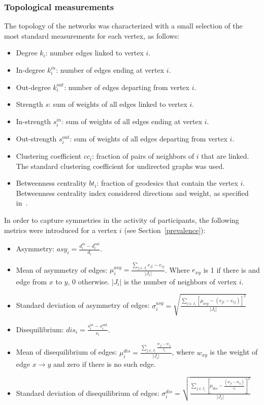 \documentclass[%
 aip,
 jmp,%
 amsmath,amssymb,
 reprint,%
]{revtex4-1}
\begin{document}
\subsubsection{Topological measurements}\label{measures}

The topology of the networks was characterized with a small selection of the most standard measurements for each vertex, as follows:

\begin{itemize}
    \item Degree $k_i$: number edges linked to vertex $i$.
    \item In-degree $k_i^{in}$: number of edges ending at vertex $i$.
    \item Out-degree $k_i^{out}$: number of edges departing from vertex $i$.
    \item Strength $s$: sum of weights of all edges linked to vertex $i$.
    \item In-strength $s_i^{in}$: sum of weights of all edges ending at vertex $i$.
    \item Out-strength $s_i^{out}$: sum of weights of all edges departing from vertex $i$.
    \item Clustering coefficient $cc_i$: fraction of pairs of neighbors of $i$ that are linked.  The standard clustering coefficient for undirected graphs was used.
  \item Betweenness centrality $bt_i$: fraction of geodesics that contain the vertex $i$. Betweenness centrality index considered directions and weight, as specified in~\cite{faster}.
\end{itemize}

In order to capture symmetries in the activity of participants, the following metrics were introduced for a vertex $i$ (see Section~\ref{prevalence}):

\begin{itemize}
    \item Asymmetry: $asy_i=\frac{d_i^{in}-d_i^{out}}{d_i}$.
    \item Mean of asymmetry of edges: $\mu_i^{asy}=\frac{\sum_{j\in J_i} e_{ji}-e_{ij}}{|J_i|}$. Where $e_{xy}$ is 1 if there is and edge from $x$ to $y$, $0$ otherwise. $|J_i|$ is the number of neighbors of vertex $i$.
    \item Standard deviation of asymmetry of edges: $\sigma_i^{asy}=\sqrt{\frac{\sum_{j\in J_i}[\mu_{asy} -(e_{ji}-e_{ij}) ]^2  }{|J_i|}  }$
    \item Disequilibrium: $dis_i=\frac{s_i^{in}-s_i^{out}}{s_i}$.
    \item Mean of disequilibrium of edges: $\mu_i^{dis}=\frac{\sum_{j \in J_i}\frac{w_{ji}-w_{ij}}{s_i}}{|J_i|}$, where $w_{xy}$ is the weight of edge $x\rightarrow y$ and zero if there is no such edge.
    \item Standard deviation of disequilibrium of edges: $\sigma_i^{dis}=\sqrt{\frac{\sum_{j\in J_i}[\mu_{dis}-\frac{(w_{ji}-w_{ij})}{s_i}]^2}{|J_i|}}$
\end{itemize}
\end{document}
